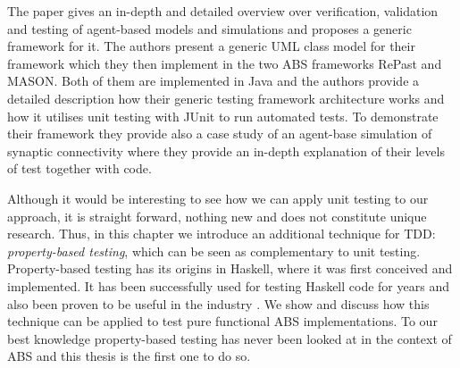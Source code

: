 The paper \cite{gurcan_generic_2013} gives an in-depth and detailed overview over verification, validation and testing of agent-based models and simulations and proposes a generic framework for it. The authors present a generic UML class model for their framework which they then implement in the two ABS frameworks RePast and MASON. Both of them are implemented in Java and the authors provide a detailed description how their generic testing framework architecture works and how it utilises unit testing with JUnit to run automated tests. To demonstrate their framework they provide also a case study of an agent-base simulation of synaptic connectivity where they provide an in-depth explanation of their levels of test together with code.

\medskip

Although it would be interesting to see how we can apply unit testing to our approach, it is straight forward, nothing new and does not constitute unique research. Thus, in this chapter we introduce an additional technique for TDD: \textit{property-based testing}, which can be seen as complementary to unit testing. Property-based testing has its origins \cite{claessen_quickcheck_2000,claessen_testing_2002,runciman_smallcheck_2008} in Haskell, where it was first conceived and implemented. It has been successfully used for testing Haskell code for years and also been proven to be useful in the industry \cite{hughes_quickcheck_2007}. We show and discuss how this technique can be applied to test pure functional ABS implementations. To our best knowledge property-based testing has never been looked at in the context of ABS and this thesis is the first one to do so.

\medskip

